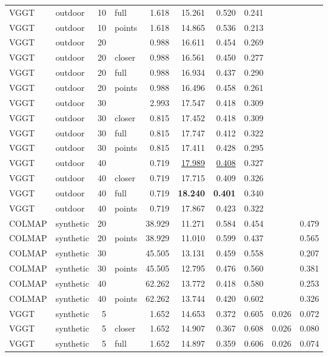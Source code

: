 \begin{table}[H]
\begin{tabular}{llrlrrrrrr}
VGGT & outdoor & 10 & full & 1.618 & 15.261 & 0.520 & 0.241 &  &  \\
VGGT & outdoor & 10 & points & 1.618 & 14.865 & 0.536 & 0.213 &  &  \\
VGGT & outdoor & 20 &  & 0.988 & 16.611 & 0.454 & 0.269 &  &  \\
VGGT & outdoor & 20 & closer & 0.988 & 16.561 & 0.450 & 0.277 &  &  \\
VGGT & outdoor & 20 & full & 0.988 & 16.934 & 0.437 & 0.290 &  &  \\
VGGT & outdoor & 20 & points & 0.988 & 16.496 & 0.458 & 0.261 &  &  \\
VGGT & outdoor & 30 &  & 2.993 & 17.547 & 0.418 & 0.309 &  &  \\
VGGT & outdoor & 30 & closer & 0.815 & 17.452 & 0.418 & 0.309 &  &  \\
VGGT & outdoor & 30 & full & 0.815 & 17.747 & 0.412 & 0.322 &  &  \\
VGGT & outdoor & 30 & points & 0.815 & 17.411 & 0.428 & 0.295 &  &  \\
VGGT & outdoor & 40 &  & 0.719 & \underline{17.989} & \underline{0.408} & 0.327 &  &  \\
VGGT & outdoor & 40 & closer & 0.719 & 17.715 & 0.409 & 0.326 &  &  \\
VGGT & outdoor & 40 & full & 0.719 & \textbf{18.240} & \textbf{0.401} & 0.340 &  &  \\
VGGT & outdoor & 40 & points & 0.719 & 17.867 & 0.423 & 0.322 &  &  \\
\midrule
COLMAP & synthetic & 20 &  & 38.929 & 11.271 & 0.584 & 0.454 &  & 0.479 \\
COLMAP & synthetic & 20 & points & 38.929 & 11.010 & 0.599 & 0.437 &  & 0.565 \\
COLMAP & synthetic & 30 &  & 45.505 & 13.131 & 0.459 & 0.558 &  & 0.207 \\
COLMAP & synthetic & 30 & points & 45.505 & 12.795 & 0.476 & 0.560 &  & 0.381 \\
COLMAP & synthetic & 40 &  & 62.262 & 13.772 & 0.418 & 0.580 &  & 0.253 \\
COLMAP & synthetic & 40 & points & 62.262 & 13.744 & 0.420 & 0.602 &  & 0.326 \\
VGGT & synthetic & 5 &  & 1.652 & 14.653 & 0.372 & 0.605 & 0.026 & 0.072 \\
VGGT & synthetic & 5 & closer & 1.652 & 14.907 & 0.367 & 0.608 & 0.026 & 0.080 \\
VGGT & synthetic & 5 & full & 1.652 & 14.897 & 0.359 & 0.606 & 0.026 & 0.074 \\

\end{tabular}
\end{table}
